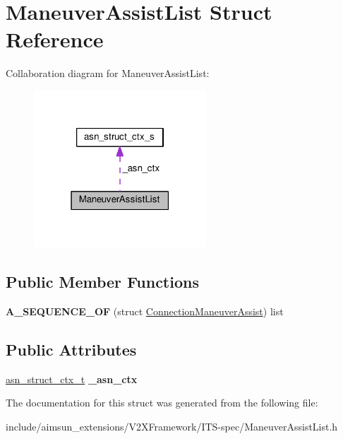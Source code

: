 \hypertarget{structManeuverAssistList}{}\section{Maneuver\+Assist\+List Struct Reference}
\label{structManeuverAssistList}


Collaboration diagram for Maneuver\+Assist\+List\+:\nopagebreak
\begin{figure}[H]
\begin{center}
\leavevmode
\includegraphics[width=183pt]{structManeuverAssistList__coll__graph}
\end{center}
\end{figure}
\subsection*{Public Member Functions}
\begin{DoxyCompactItemize}
\item 
{\bfseries A\+\_\+\+S\+E\+Q\+U\+E\+N\+C\+E\+\_\+\+OF} (struct \hyperlink{structConnectionManeuverAssist}{Connection\+Maneuver\+Assist}) list\hypertarget{structManeuverAssistList_a5833b188602fb443cd5335adc09442e0}{}\label{structManeuverAssistList_a5833b188602fb443cd5335adc09442e0}

\end{DoxyCompactItemize}
\subsection*{Public Attributes}
\begin{DoxyCompactItemize}
\item 
\hyperlink{structasn__struct__ctx__s}{asn\+\_\+struct\+\_\+ctx\+\_\+t} {\bfseries \+\_\+asn\+\_\+ctx}\hypertarget{structManeuverAssistList_a4837a6f055b1e4aca94556f00c4ca070}{}\label{structManeuverAssistList_a4837a6f055b1e4aca94556f00c4ca070}

\end{DoxyCompactItemize}


The documentation for this struct was generated from the following file\+:\begin{DoxyCompactItemize}
\item 
include/aimsun\+\_\+extensions/\+V2\+X\+Framework/\+I\+T\+S-\/spec/Maneuver\+Assist\+List.\+h\end{DoxyCompactItemize}

